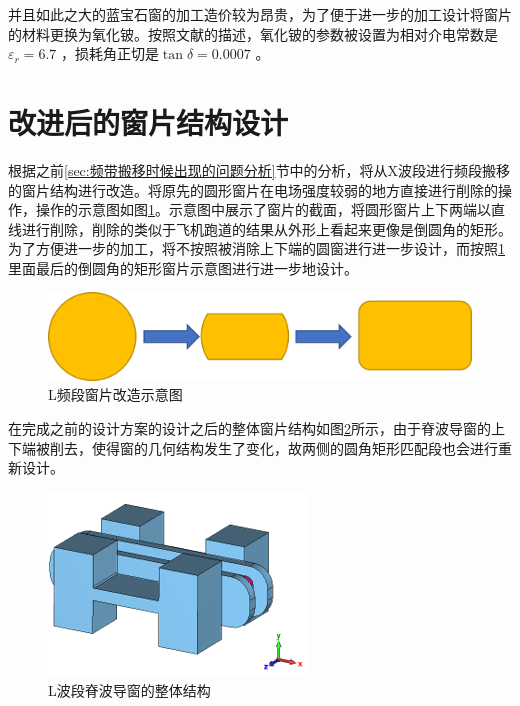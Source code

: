 \documentclass[master]{thesis-uestc}
\begin{document}
并且如此之大的蓝宝石窗的加工造价较为昂贵，为了便于进一步的加工设计将窗片的材料更换为氧化铍。按照文献\cite{thumm_2020_State}的描述，氧化铍的参数被设置为相对介电常数是$\varepsilon_r = 6.7$ ，损耗角正切是$\tan \delta = 0.0007$ 。

\section{改进后的窗片结构设计}
根据之前\ref{sec:频带搬移时候出现的问题分析}节中的分析，将从X波段进行频段搬移的窗片结构进行改造。将原先的圆形窗片在电场强度较弱的地方直接进行削除的操作，操作的示意图如图\ref{fig:L频段改造}。示意图中展示了窗片的截面，将圆形窗片上下两端以直线进行削除，削除的类似于飞机跑道的结果从外形上看起来更像是倒圆角的矩形。为了方便进一步的加工，将不按照被消除上下端的圆窗进行进一步设计，而按照\ref{fig:L频段改造}里面最后的倒圆角的矩形窗片示意图进行进一步地设计。
\begin{figure}[!htb]
    \centering
    \includegraphics[width=0.6\linewidth]{pic/chapter4/L脊波导窗片改造.png}
    \caption{L频段窗片改造示意图}
    \label{fig:L频段改造}
\end{figure}

在完成之前的设计方案的设计之后的整体窗片结构如图\ref{fig:L波段脊波导窗的整体结构}所示，由于脊波导窗的上下端被削去，使得窗的几何结构发生了变化，故两侧的圆角矩形匹配段也会进行重新设计。

\begin{figure}[!htb]
    \centering
    \includegraphics[width=0.5\linewidth]{pic/chapter4/L波段脊波导窗整体结构.png}
    \caption{L波段脊波导窗的整体结构}
    \label{fig:L波段脊波导窗的整体结构}
\end{figure}
\end{document}
